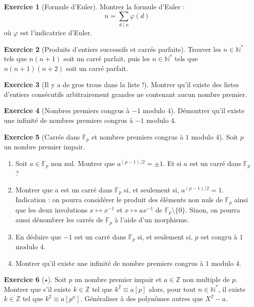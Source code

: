 \documentclass[french]{book}
\newcommand{\N}{\mathbb{N}}
\newcommand{\Z}{\mathbb{Z}}
\newcommand{\st}{^*}
\newcommand{\inv}{^{-1}}
\newcommand{\F}{\mathbb{F}}
\theoremstyle{definition}
\newtheorem{ex}{Exercice}[chapter]
\theoremstyle{theorem}
\theoremstyle{remark}
\begin{document}
\begin{ex}[Formule d'Euler]
	Montrer la formule d'Euler : $$n=\sum_{d\mid n}\varphi(d)$$ où $\varphi$ est l'indicatrice d'Euler.
\end{ex}

\begin{ex}[Produits d'entiers successifs et carrés parfaits]
	Trouver les $n\in\N\st$ tels que $n(n+1)$ soit un carré parfait, puis les $n\in\N\st$ tels que $n(n+1)(n+2)$ soit un carré parfait.
\end{ex}

\begin{ex}[Il y a de gros trous dans la liste !]
	Montrer qu'il existe des listes d'entiers consécutifs arbitrairement grandes ne contenant aucun nombre premier.
\end{ex}

\begin{ex}[Nombres premiers congrus à $-1$ modulo $4$]
	Démontrer qu'il existe une infinité de nombres premiers congrus à $-1$ modulo $4$.
\end{ex}

\begin{ex}[Carrés dans $\F_p$ et nombres premiers congrus à $1$ modulo $4$]
	Soit $p$ un nombre premier impair.
	\begin{enumerate}
		\item Soit $a\in\F_p$ non nul. Montrer que $a^{(p-1)/2}=\pm 1$. Et si $a$ est un carré dans $\F_p$ ?
		\item Montrer que $a$ est un carré dans $\F_p$ si, et seulement si, $a^{(p-1)/2}=1$. Indication : on pourra considérer le produit des éléments non nuls de $\F_p$ ainsi que les deux involutions $x\mapsto x\inv$ et $x\mapsto ax\inv$ de $\F_p\setminus\{0\}$. Sinon, on pourra aussi dénombrer les carrés de $\F_p$ à l'aide d'un morphisme.
		\item En déduire que $-1$ est un carré dans $\F_p$ si, et seulement si, $p$ est congru à $1$ modulo $4$.
		\item Montrer qu'il existe une infinité de nombre premiers congrus à $1$ modulo $4$.
	\end{enumerate}
\end{ex}

\begin{ex}[$\star$]
	Soit $p$ un nombre premier impair et $a\in\Z$ non multiple de $p$. Montrer que s'il existe $k\in\Z$ tel que $k^2\equiv a[p]$ alors, pour tout $n\in\N\st$, il existe $k\in\Z$ tel que $k^2\equiv a[p^n]$. Généraliser à des polynômes autres que $X^2-a$.
\end{ex}
\end{document}

